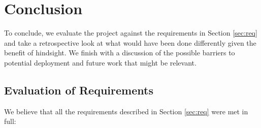 \chapter{Conclusion}\label{ch:conclusion}
\label{con}

To conclude, we evaluate the project against the requirements in Section \ref{sec:req} and take a retrospective look at what would have been done differently given the benefit of hindsight. We finish with a discussion of the possible barriers to potential deployment and future work that might be relevant.

\section{Evaluation of Requirements}
\label{sec:eval-require}

We believe that all the requirements described in Section \ref{sec:req} were met in full:

